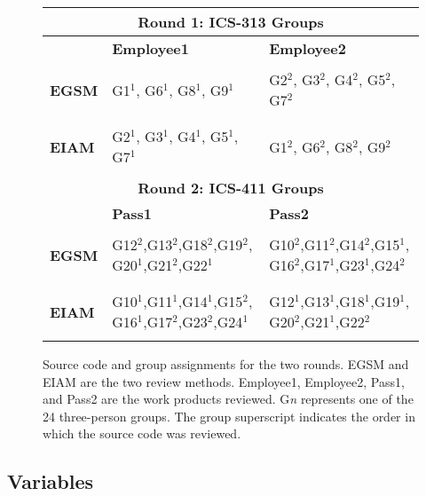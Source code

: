 \begin{figure}[htb]
    \small
  \begin{center}
    \begin{tabular} {|l|p{2.5in}|p{2.5in}|}
      \multicolumn{3}{c}{{\bf Round 1: ICS-313 Groups}}\\
      \hline
      & {\bf Employee1} & {\bf Employee2}\\
      \hline
      & & \\
      {\bf EGSM} & G1$^1$, G6$^1$, G8$^1$, G9$^1$ & G2$^2$, G3$^2$, G4$^2$, G5$^2$, G7$^2$ \\
      & & \\
      \hline
      & & \\
      {\bf EIAM} & G2$^1$, G3$^1$, G4$^1$, G5$^1$, G7$^1$ & G1$^2$, G6$^2$, G8$^2$, G9$^2$ \\
      & &  \\
      \hline
      \multicolumn{3}{c}{{\bf Round 2: ICS-411 Groups}}\\
      \hline
      & {\bf Pass1} & {\bf Pass2}\\
      \hline
      & & \\
      {\bf EGSM} & G12$^2$,G13$^2$,G18$^2$,G19$^2$, G20$^1$,G21$^2$,G22$^1$ & G10$^2$,G11$^2$,G14$^2$,G15$^1$, G16$^2$,G17$^1$,G23$^1$,G24$^2$\\
      & & \\
      \hline
      & & \\
      {\bf EIAM} & G10$^1$,G11$^1$,G14$^1$,G15$^2$,
      G16$^1$,G17$^2$,G23$^2$,G24$^1$ & G12$^1$,G13$^1$,G18$^1$,G19$^1$, G20$^2$,G21$^1$,G22$^2$ \\
      & &  \\
      \hline
     \end{tabular}
  \end{center}
  \caption{Source code and group assignments for the two rounds. 
           EGSM and EIAM are the two review methods. 
           Employee1, Employee2, Pass1, and Pass2 are the work products reviewed.
           G{\em n}  represents one of the 24 three-person groups. 
           The group superscript indicates the order in which the source code was
           reviewed.
}


  \label{design}
  \normalsize
\end{figure}

\subsection{Variables}

